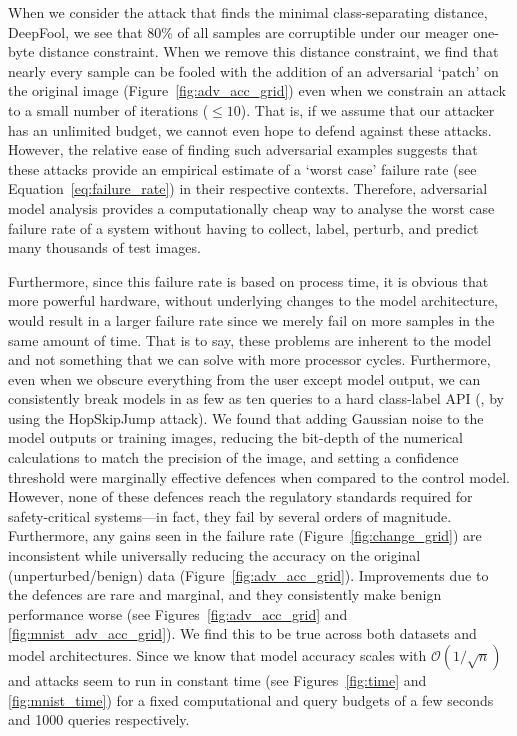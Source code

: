 When we consider the attack that finds the minimal class-separating distance, DeepFool, we see that 80\% of all samples are corruptible under our meager one-byte distance constraint.
When we remove this distance constraint, we find that nearly every sample can be fooled with the addition of an adversarial `patch' on the original image (Figure~\ref{fig:adv_acc_grid}) even when we constrain an attack to a small number of iterations ($\leq 10$).
That is, if we assume that our attacker has an unlimited budget, we cannot even hope to defend against these attacks.
However, the relative ease of finding such adversarial examples suggests that these attacks provide an empirical estimate of a `worst case' failure rate (see Equation~\ref{eq:failure_rate}) in their respective contexts.
Therefore, adversarial model analysis provides a computationally cheap way to analyse the worst case failure rate of a system without having to collect, label, perturb, and predict many thousands of test images.

Furthermore, since this failure rate is based on process time, it is obvious that more powerful hardware, without underlying changes to the model architecture, would result in a larger failure rate since we merely fail on more samples in the same amount of time.
That is to say, these problems are inherent to the model and not something that we can solve with more processor cycles.
Furthermore, even when we obscure everything from the user except model output, we can consistently break models in as few as ten queries to a hard class-label API (\eg, by using the HopSkipJump attack).
We found that adding Gaussian noise to the model outputs or training images, reducing the bit-depth of the numerical calculations to match the precision of the image, and setting a confidence threshold were marginally effective defences when compared to the control model.
However, none of these defences reach the regulatory standards required for safety-critical systems---in fact, they fail by several orders of magnitude.
Furthermore, any gains seen in the failure rate (Figure~\ref{fig:change_grid}) are inconsistent while universally reducing the accuracy on the original (unperturbed/benign) data (Figure~\ref{fig:adv_acc_grid}).
Improvements due to the defences are rare and marginal, and they consistently make benign performance worse (see Figures~\ref{fig:adv_acc_grid} and \ref{fig:mnist_adv_acc_grid}).
We find this to be true across both datasets and model architectures.
Since we know that model accuracy scales with $\mathcal{O}(1/\sqrt{n})$~\cite{vapnik1994measuring} and attacks seem to run in constant time (see Figures~\ref{fig:time} and \ref{fig:mnist_time}) for a fixed computational and query budgets of a few seconds and 1000 queries respectively.

